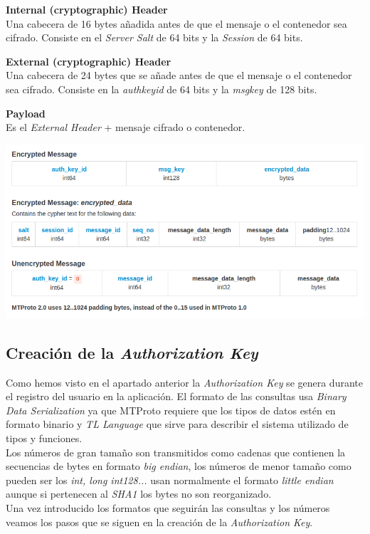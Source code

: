 \begin{description}
	\item \textbf{Internal (cryptographic) Header}\\
	Una cabecera de 16 bytes añadida antes de que el mensaje o el contenedor sea cifrado. Consiste en el \emph{Server Salt} de 64 bits y la \emph{Session} de 64 bits.

	\item \textbf{External (cryptographic) Header}\\
	Una cabecera de 24 bytes que se añade antes de que el mensaje o el contenedor sea cifrado. Consiste en la \emph{auth\textunderscore key\textunderscore id} de 64 bits y la \emph{msg\textunderscore key} de 128 bits.

	\item \textbf{Payload}\\
	Es el \emph{External Header} + mensaje cifrado o contenedor.
\end{description}

\includegraphics[scale=0.5]{imagenes/MTProto2.png} 

\subsection{Creación de la \emph{Authorization Key}}
Como hemos visto en el apartado anterior la \emph{Authorization Key} se genera durante el registro del usuario en la aplicación. El formato de las consultas usa \emph{Binary Data Serialization} ya que MTProto requiere que los tipos de datos estén en formato binario y \emph{TL Language} que sirve para describir el sistema utilizado de tipos y funciones.\\
Los números de gran tamaño son transmitidos como cadenas que contienen la secuencias de bytes en formato \emph{big endian}, los números de menor tamaño como pueden ser los \emph{int, long int128...} usan normalmente el formato \emph{little endian} aunque si pertenecen al \emph{SHA1} los bytes no son reorganizado.\\
Una vez introducido los formatos que seguirán las consultas y los números veamos los pasos que se siguen en la creación de la \emph{Authorization Key}.

